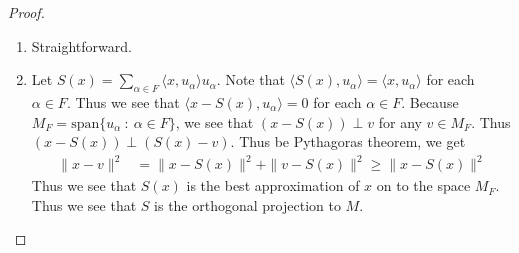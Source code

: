 \begin{proof}
  \begin{enumerate}[label=(\alph*)]
    \item Straightforward.
    \item Let $S(x) = \sum_{\alpha \in  F} \langle x , u_\alpha
      \rangle  u_\alpha$. Note that $ \langle S(x) ,  u_\alpha
      \rangle = \langle x , u_\alpha \rangle$ for each $ \alpha \in
      F$. Thus we see that $ \langle x - S(x) , u_\alpha \rangle = 0$
      for each $ \alpha \in F$. Because $M_F = \textrm{span}\{
      u_\alpha  \ : \   \alpha \in F \}$, we see that $(x - S(x))
      \perp v$ for any $v \in M_F$. Thus $(x - S(x))\perp (S(x) -
      v)$. Thus be Pythagoras theorem, we get
      \begin{align*}
        \|x - v\|^2 &= \|x - S(x)\|^2 + \|v - S(x)\|^2 \ge \|x - S(x)\|^2
      \end{align*}
      Thus we see that $S(x)$ is the best approximation of $x$ on to the
      space $M_F$. Thus we see that $S$ is the orthogonal projection to $ M$.
  \end{enumerate}
\end{proof}

